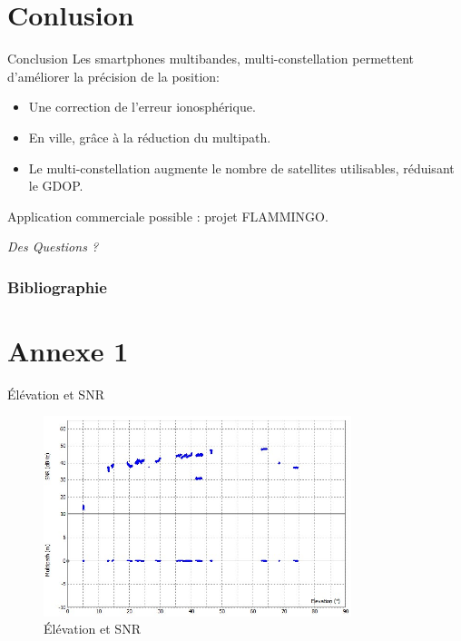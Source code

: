 \documentclass[xcolor=dvipsnames,envcountsect]{beamer}
\makeatletter
\let\beamer@writeslidentry@miniframeson=\beamer@writeslidentry
\def\beamer@writeslidentry@miniframesoff{%
  \expandafter\beamer@ifempty\expandafter{\beamer@framestartpage}{}%
  {%
    \clearpage\beamer@notesactions%
  }
}
\newcommand*{\miniframeson}{\let\beamer@writeslidentry=\beamer@writeslidentry@miniframeson}
\newcommand*{\miniframesoff}{\let\beamer@writeslidentry=\beamer@writeslidentry@miniframesoff}
\makeatother
\begin{document}
\section{Conlusion}
\begin{frame}{Conclusion}
	Les smartphones multibandes, multi-constellation permettent d'améliorer la précision de la position:
	\begin{itemize}
		\item Une correction de l'erreur ionosphérique.
		\item En ville, grâce à la réduction du multipath.
		\item Le multi-constellation augmente le nombre de satellites utilisables, réduisant le GDOP.
	\end{itemize}
	Application commerciale possible : projet FLAMMINGO.
\end{frame}

\miniframesoff
\begin{frame}
	\centering
	\begin{block}
		\scshape
			\begin{center}
				\Huge\emph{Des Questions ?}
			\end{center}
	\end{block}
\end{frame}

\miniframeson
\appendix
\begin{frame}[allowframebreaks]
	\frametitle{Bibliographie}
	\printbibliography
\end{frame}

\section{Annexe 1}
	

\begin{frame}{Élévation et SNR}
	\begin{figure}
		\centering
		\includegraphics[width=0.8\textwidth]{./Figures/SNR_elev.jpg}
		\caption{Élévation et SNR}
	\end{figure}
\end{frame}
\end{document}
